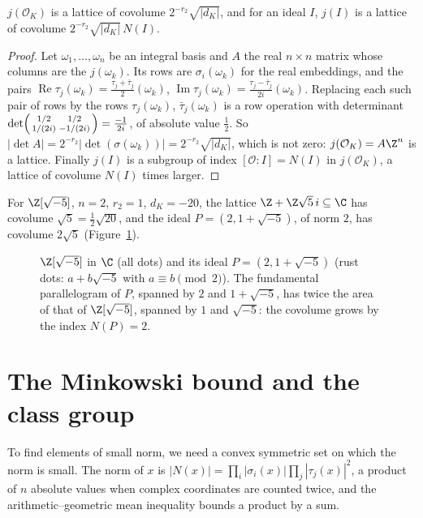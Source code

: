 \begin{proposition}\label{prop:covol}
$j(\mathcal O_K)$ is a lattice of covolume $2^{-r_2}\sqrt{|d_K|}$, and for an ideal $I$, $j(I)$ is a lattice of covolume
$2^{-r_2}\sqrt{|d_K|}\,N(I)$.
\end{proposition}
\begin{proof}
Let $\omega_1,\dots,\omega_n$ be an integral basis and $A$ the real $n\times n$ matrix whose columns are the
$j(\omega_k)$. Its rows are $\sigma_i(\omega_k)$ for the real embeddings, and the pairs $\operatorname{Re}\tau_j(\omega_k)
=\frac{\tau_j+\bar\tau_j}2(\omega_k)$, $\operatorname{Im}\tau_j(\omega_k)=\frac{\tau_j-\bar\tau_j}{2i}(\omega_k)$. Replacing
each such pair of rows by the rows $\tau_j(\omega_k)$, $\bar\tau_j(\omega_k)$ is a row operation with determinant
$\det\begin{psmallmatrix}1/2&1/2\\1/(2i)&-1/(2i)\end{psmallmatrix}=\frac{-1}{2i}$, of absolute value $\frac12$. So
$|\det A|=2^{-r_2}|\det(\sigma(\omega_k))|=2^{-r_2}\sqrt{|d_K|}$, which is not zero: $j(\mathcal O_K)=A\Z^n$ is a
lattice. Finally $j(I)$ is a subgroup of index $[\mathcal O:I]=N(I)$ in $j(\mathcal O_K)$, a lattice of covolume
$N(I)$ times larger.
\end{proof}

For $\Z[\sqrt{-5}]$, $n=2$, $r_2=1$, $d_K=-20$, the lattice $\Z+\Z\sqrt5\,i\subseteq\C$ has covolume $\sqrt5=\frac12\sqrt{20}$,
and the ideal $P=(2,1+\sqrt{-5})$, of norm $2$, has covolume $2\sqrt5$ (Figure~\ref{fig:ideal3}).

\begin{figure}[ht]
\centering
{}
\caption{$\Z[\sqrt{-5}]$ in $\C$ (all dots) and its ideal $P=(2,1+\sqrt{-5})$ (rust dots: $a+b\sqrt{-5}$ with $a\equiv b
\pmod 2$). The fundamental parallelogram of $P$, spanned by $2$ and $1+\sqrt{-5}$, has twice the area of that of $\Z[\sqrt{-5}]$,
spanned by $1$ and $\sqrt{-5}$: the covolume grows by the index $N(P)=2$.}
\label{fig:ideal3}
\end{figure}

\section{The Minkowski bound and the class group}

To find elements of small norm, we need a convex symmetric set on which the norm is small. The norm of $x$ is
$|N(x)|=\prod_i|\sigma_i(x)|\prod_j|\tau_j(x)|^2$, a product of $n$ absolute values when complex coordinates are counted
twice, and the arithmetic--geometric mean inequality bounds a product by a sum.

